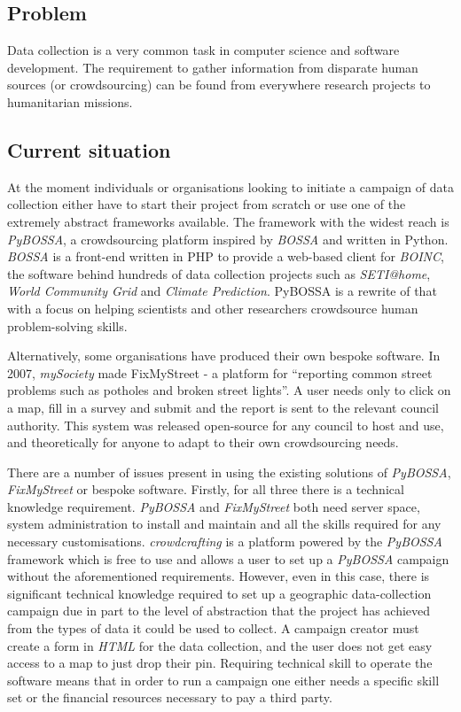 \documentclass{article}
\begin{document}
		\subsection{Problem}
		Data collection is a very common task in computer science and software development. The requirement to gather information from disparate human sources (or crowdsourcing) can be found from everywhere research projects to humanitarian missions.

		\subsection{Current situation}
		At the moment individuals or organisations looking to initiate a campaign of data collection either have to start their project from scratch or use one of the extremely abstract frameworks available. The framework with the widest reach is \emph{PyBOSSA}, a crowdsourcing platform inspired by \emph{BOSSA} and written in Python. \emph{BOSSA} is a front-end written in PHP to provide a web-based client for \emph{BOINC}, the software behind hundreds of data collection projects such as \emph{SETI@home}, \emph{World Community Grid} and \emph{Climate Prediction}\cite{_boinc_2015}. PyBOSSA is a rewrite of that with a focus on helping scientists and other researchers crowdsource human problem-solving skills.

		Alternatively, some organisations have produced their own bespoke software. In 2007, \emph{mySociety} made FixMyStreet - a platform for ``reporting common street problems such as potholes and broken street lights''\cite{_mysociety/fixmystreet_2015}. A user needs only to click on a map, fill in a survey and submit and the report is sent to the relevant council authority. This system was released open-source for any council to host and use, and theoretically for anyone to adapt to their own crowdsourcing needs.

		There are a number of issues present in using the existing solutions of \emph{PyBOSSA}, \emph{FixMyStreet} or bespoke software. Firstly, for all three there is a technical knowledge requirement. \emph{PyBOSSA} and \emph{FixMyStreet} both need server space, system administration to install and maintain and all the skills required for any necessary customisations. \emph{crowdcrafting} is a platform powered by the \emph{PyBOSSA} framework which is free to use and allows a user to set up a \emph{PyBOSSA} campaign without the aforementioned requirements. However, even in this case, there is significant technical knowledge required to set up a geographic data-collection campaign due in part to the level of abstraction that the project has achieved from the types of data it could be used to collect. A campaign creator must create a form in \emph{HTML} for the data collection, and the user does not get easy access to a map to just drop their pin. Requiring technical skill to operate the software means that in order to run a campaign one either needs a specific skill set or the financial resources necessary to pay a third party.
\end{document}
